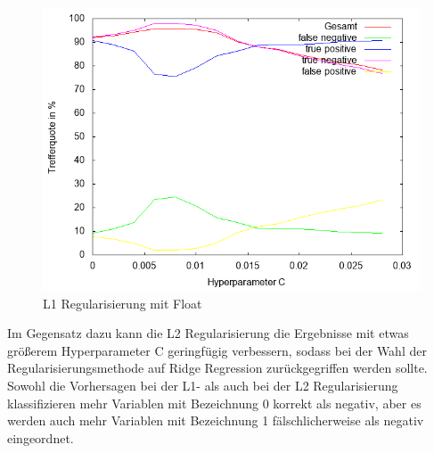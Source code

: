 \begin{figure}[ht]
\centering
\includegraphics[scale=.7]{bilder/pareto_l1_float}
\caption{L1 Regularisierung mit Float}
\end{figure}
Im Gegensatz dazu kann die L2 Regularisierung die Ergebnisse mit etwas größerem Hyperparameter C geringfügig verbessern, sodass bei der Wahl der Regularisierungsmethode auf Ridge Regression zurückgegriffen werden sollte. Sowohl die Vorhersagen bei der L1- als auch bei der L2 Regularisierung klassifizieren mehr Variablen mit Bezeichnung 0 korrekt als negativ, aber es werden auch mehr Variablen mit Bezeichnung 1 fälschlicherweise als negativ eingeordnet. 

